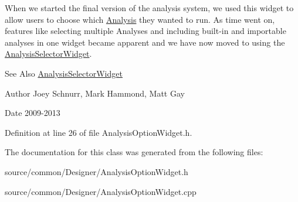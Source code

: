 When we started the final version of the analysis system, we used this widget to allow users to choose which \hyperlink{class_picto_1_1_analysis}{Analysis} they wanted to run. As time went on, features like selecting multiple Analyses and including built-\/in and importable analyses in one widget became apparent and we have now moved to using the \hyperlink{class_picto_1_1_analysis_selector_widget}{Analysis\-Selector\-Widget}. \begin{DoxySeeAlso}{See Also}
\hyperlink{class_picto_1_1_analysis_selector_widget}{Analysis\-Selector\-Widget} 
\end{DoxySeeAlso}
\begin{DoxyAuthor}{Author}
Joey Schnurr, Mark Hammond, Matt Gay 
\end{DoxyAuthor}
\begin{DoxyDate}{Date}
2009-\/2013 
\end{DoxyDate}


Definition at line 26 of file Analysis\-Option\-Widget.\-h.



The documentation for this class was generated from the following files\-:\begin{DoxyCompactItemize}
\item 
source/common/\-Designer/Analysis\-Option\-Widget.\-h\item 
source/common/\-Designer/Analysis\-Option\-Widget.\-cpp\end{DoxyCompactItemize}
